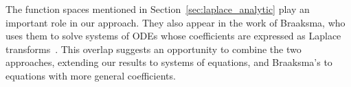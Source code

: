 \documentclass{article}
\newcommand{\C}{\mathbb{C}}
\newcommand{\series}[1]{\tilde{#1}}
\theoremstyle{definition}
\theoremstyle{plain}
\begin{document}
The function spaces mentioned in Section~\ref{sec:laplace_analytic} play an important role in our approach. They also appear in the work of Braaksma, who uses them to solve systems of ODEs whose coefficients are expressed as Laplace transforms~\cite{braaksma2006laplace}. This overlap suggests an opportunity to combine the two approaches, extending our results to systems of equations, and Braaksma's to equations with more general coefficients. %
%
%
\end{document}
